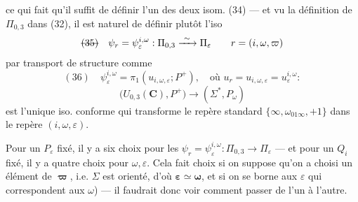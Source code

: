 \documentclass[11pt,a4paper]{article}
\begin{document}

ce qui fait qu'il suffit de définir l'un des deux isom. (34) — et vu la définition de
$\Pi_{0,3}$ dans (32), il est naturel de définir plutôt l'iso
\[
  \text{\struck{(35)}}\quad
  \psi_r = \psi_{\varepsilon}^{i,\omega} : \Pi_{0,3} \xrightarrow{\ \sim\ } \Pi_\varepsilon
  \qquad r = (i, \omega, \varpi)
\]
par transport de structure comme
\[
  (36)\quad
  \psi_\varepsilon^{i,\omega} = \pi_1(u_{i,\omega,\varepsilon} ; P^{+}),
  \quad \text{où } u_r = u_{i,\omega,\varepsilon} = u_\varepsilon^{i,\omega} :
\]
\[
  \big(U_{0,3}(\mathbf{C}), P^{+}\big) \longrightarrow (\Sigma^{*}, P_\omega)
\]
est l'unique iso. conforme qui transforme le repère standard
$\{\infty, \omega_{01\infty}, +1\}$ \struck{\ill{}} dans le repère \struck{\ill{}}
$(i, \omega, \varepsilon)$.

Pour un $P_\varepsilon$ fixé, il y a six choix pour les
$\psi_r = \psi_{\varepsilon}^{i,\omega} : \Pi_{0,3} \to \Pi_\varepsilon$ — et pour un $Q_i$
fixé, il y a quatre choix pour $\omega, \varepsilon$. Cela fait 
 choix si on suppose qu'on a choisi un élément de $\boldsymbol{\varpi}$, i.e.
$\Sigma$ est orienté, d'où $\boldsymbol{\varepsilon} \simeq \boldsymbol{\omega}$, et si on se
borne aux $\varepsilon$ qui correspondent aux $\omega$) — il faudrait donc voir comment
passer  de l'un à l'autre.
\end{document}
